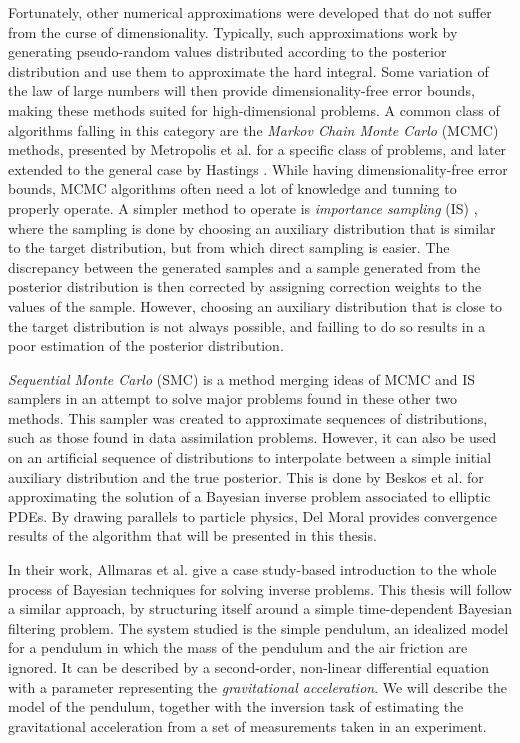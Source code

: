 Fortunately, other numerical approximations were developed that do not suffer from the curse of dimensionality. Typically, such approximations work by generating pseudo-random values distributed according to the posterior distribution and use them to approximate the hard integral. Some variation of the law of large numbers will then provide dimensionality-free error bounds, making these methods suited for high-dimensional problems. A common class of algorithms falling in this category are the \textit{Markov Chain Monte Carlo} (MCMC) methods, presented by Metropolis et al. \cite{metropolis1953equation} for a specific class of problems, and later extended to the general case by Hastings \cite{hastings1970monte}. While having dimensionality-free error bounds, MCMC algorithms often need a lot of knowledge and tunning to properly operate. A simpler method to operate is \textit{importance sampling} (IS) \cite{Robert}, where the sampling is done by choosing an auxiliary distribution that is similar to the target distribution, but from which direct sampling is easier. The discrepancy between the generated samples and a sample generated from the posterior distribution is then corrected by assigning correction weights to the values of the sample. However, choosing an auxiliary distribution that is close to the target distribution is not always possible, and failling to do so results in a poor estimation of the posterior distribution.

\textit{Sequential Monte Carlo} (SMC) \cite{del_moral_2006} is a method merging ideas of MCMC and IS samplers in an attempt to solve major problems found in these other two methods. This sampler was created to approximate sequences of distributions, such as those found in data assimilation problems. However, it can also be used on an artificial sequence of distributions to interpolate between a simple initial auxiliary distribution and the true posterior. This is done by Beskos et al. \cite{beskos2015sequential} for approximating the solution of a Bayesian inverse problem associated to elliptic PDEs. By drawing parallels to particle physics, Del Moral \cite{del2013mean, del2004feynman} provides convergence results of the algorithm that will be presented in this thesis.

In their work, Allmaras et al. \cite{bayes-tutorial} give a case study-based introduction to the whole process of Bayesian techniques for solving inverse problems. This thesis will follow a similar approach, by structuring itself around a simple time-dependent Bayesian filtering problem. The system studied is the simple pendulum, an idealized model for a pendulum in which the mass of the pendulum and the air friction are ignored. It can be described by a second-order, non-linear differential equation with a parameter representing the \textit{gravitational acceleration}. We will describe the model of the pendulum, together with the inversion task of estimating the gravitational acceleration from a set of measurements taken in an experiment. 


